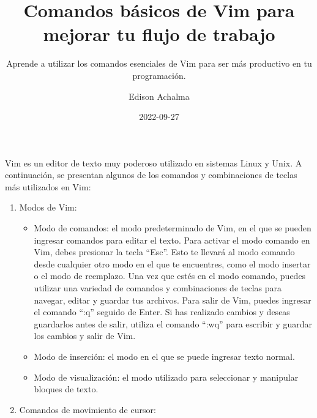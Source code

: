 \documentclass[
  letterpaper,
  DIV=11,
  numbers=noendperiod]{scrartcl}
\title{Comandos básicos de Vim para mejorar tu flujo de trabajo}
\subtitle{Aprende a utilizar los comandos esenciales de Vim para ser más
productivo en tu programación.}
\author{Edison Achalma}
\date{2022-09-27}
\begin{document}
\maketitle
\ifdefined\Shaded\renewenvironment{Shaded}{\begin{tcolorbox}[breakable, borderline west={3pt}{0pt}{shadecolor}, sharp corners, boxrule=0pt, enhanced, frame hidden, interior hidden]}{\end{tcolorbox}}\fi

Vim es un editor de texto muy poderoso utilizado en sistemas Linux y
Unix. A continuación, se presentan algunos de los comandos y
combinaciones de teclas más utilizados en Vim:

\begin{enumerate}
\def\labelenumi{\arabic{enumi}.}
\item
  Modos de Vim:

  \begin{itemize}
  \item
    Modo de comandos: el modo predeterminado de Vim, en el que se pueden
    ingresar comandos para editar el texto. Para activar el modo comando
    en Vim, debes presionar la tecla ``Esc''. Esto te llevará al modo
    comando desde cualquier otro modo en el que te encuentres, como el
    modo insertar o el modo de reemplazo. Una vez que estés en el modo
    comando, puedes utilizar una variedad de comandos y combinaciones de
    teclas para navegar, editar y guardar tus archivos. Para salir de
    Vim, puedes ingresar el comando ``:q'' seguido de Enter. Si has
    realizado cambios y deseas guardarlos antes de salir, utiliza el
    comando ``:wq'' para escribir y guardar los cambios y salir de Vim.
  \item
    Modo de inserción: el modo en el que se puede ingresar texto normal.
  \item
    Modo de visualización: el modo utilizado para seleccionar y
    manipular bloques de texto.
  \end{itemize}
\item
  Comandos de movimiento de cursor:


\end{enumerate}
\end{document}
